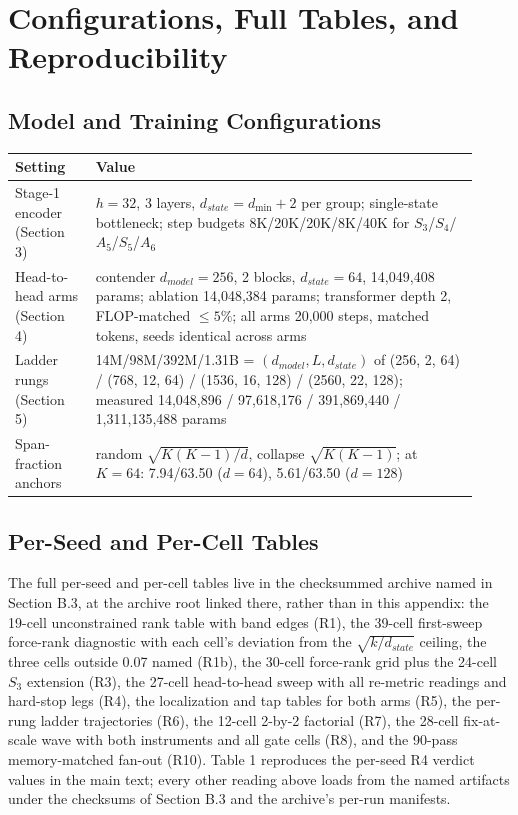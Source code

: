 \section{Configurations, Full Tables, and Reproducibility}

\subsection{Model and Training Configurations}

{\scriptsize
\begin{tabular}{>{\raggedright\arraybackslash}p{0.16\linewidth}>{\raggedright\arraybackslash}p{0.76\linewidth}}
\toprule
Setting & Value \\
\midrule
Stage-1 encoder (Section 3) & $h{=}32$, 3 layers, $d_{state} = d_{\min}+2$ per group; single-state bottleneck; step budgets 8K/20K/20K/8K/40K for $S_3$/$S_4$/$A_5$/$S_5$/$A_6$ \\
Head-to-head arms (Section 4) & contender $d_{model}{=}256$, 2 blocks, $d_{state}{=}64$, 14,049,408 params; ablation 14,048,384 params; transformer depth 2, FLOP-matched $\le 5\%$; all arms 20,000 steps, matched tokens, seeds identical across arms \\
Ladder rungs (Section 5) & 14M/98M/392M/1.31B = $(d_{model}, L, d_{state})$ of (256, 2, 64) / (768, 12, 64) / (1536, 16, 128) / (2560, 22, 128); measured 14,048,896 / 97,618,176 / 391,869,440 / 1,311,135,488 params \\
Span-fraction anchors & random $\sqrt{K(K{-}1)/d}$, collapse $\sqrt{K(K{-}1)}$; at $K{=}64$: 7.94/63.50 ($d{=}64$), 5.61/63.50 ($d{=}128$) \\
\bottomrule
\end{tabular}
}

\subsection{Per-Seed and Per-Cell Tables}

The full per-seed and per-cell tables live in the checksummed archive
named in Section B.3, at the archive root linked there, rather than in
this appendix: the 19-cell
unconstrained rank table with band edges (R1), the 39-cell first-sweep
force-rank diagnostic with each cell's deviation from the
$\sqrt{k/d_{state}}$ ceiling, the three cells outside 0.07 named
(R1b), the 30-cell force-rank
grid plus the 24-cell $S_3$ extension (R3), the 27-cell head-to-head
sweep with all re-metric readings and hard-stop legs (R4), the
localization and tap tables for both arms (R5), the per-rung ladder
trajectories (R6), the 12-cell 2-by-2 factorial (R7), the 28-cell
fix-at-scale wave with both instruments and all gate cells (R8), and
the 90-pass memory-matched fan-out (R10). Table 1 reproduces the
per-seed R4 verdict values in the main text; every other reading above
loads from the named artifacts under the checksums of Section B.3 and
the archive's per-run manifests.

